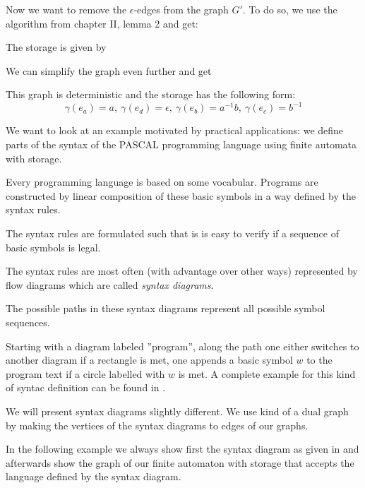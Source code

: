 Now we want to remove the $\epsilon$-edges from the graph $G'$. To do so, we use
the algorithm from chapter II, lemma 2 and get:

\begin{center}

\end{center}

The storage is given by

\begin{center}

\end{center}

We can simplify the graph even further and get

\begin{center}

\end{center}

This graph is deterministic and the storage has the following form:
\[ \gamma(e_a) = a,\ \gamma(e_d) = \epsilon,\ \gamma(e_b) = a^{-1} b,\
\gamma(e_c) = b^{-1} \]

\bigskip
We want to look at an example motivated by practical applications: we define
parts of the syntax of the PASCAL programming language using finite automata
with storage.

Every programming language is based on some vocabular. Programs are constructed
by linear composition of these basic symbols in a way defined by the syntax
rules.

The syntax rules are formulated such that is is easy to verify if a sequence of
basic symbols is legal.

The syntax rules are most often (with advantage over other ways) represented by
flow diagrams which are called {\em syntax diagrams}.

The possible paths in these syntax diagrams represent all possible symbol
sequences.

Starting with a diagram labeled ''program'', along the path one either switches
to another diagram if a rectangle is met, one appends a basic symbol $w$ to the
program text if a circle labelled with $w$ is met. A complete example for this
kind of syntac definition can be found in \cite{Wirth}.

We will present syntax diagrams slightly different. We use kind of a dual graph
by making the vertices of the syntax diagrams to edges of our graphs.

In the following example we always show first the syntax diagram as given in
\cite{Wirth} and afterwards show the graph of our finite automaton with storage
that accepts the language defined by the syntax diagram.

